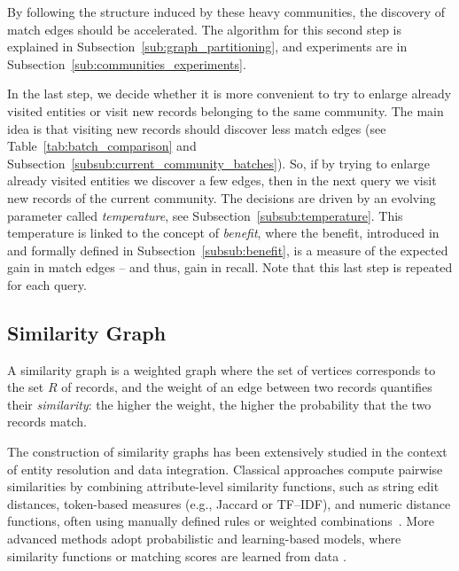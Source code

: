 \documentclass[sigconf, nonacm]{acmart}
\newcommand{\blue}[1]{\textcolor{blue}{#1}}
\begin{document}
By following the structure induced by these heavy communities, the discovery of match edges should be accelerated. The algorithm for this second step is explained in Subsection~\ref{sub:graph_partitioning}, and experiments are in Subsection~\ref{sub:communities_experiments}.

In the last step, we decide whether it is more convenient to try to enlarge already visited entities or visit new records belonging to the same community. The main idea is that visiting new records should discover less match edges (see Table~\ref{tab:batch_comparison} and Subsection~\ref{subsub:current_community_batches}). So, if by trying to enlarge already visited entities we discover a few edges, then in the next query we visit new records of the current community. The decisions are driven by an evolving parameter called \emph{temperature}, see Subsection~\ref{subsub:temperature}. This temperature is linked to the concept of  \emph{benefit}, where the benefit, introduced in~\cite{firmani2016online} and formally defined in Subsection~\ref{subsub:benefit}, is a measure of the expected gain in match edges -- and thus, gain in recall.  Note that this last step is repeated for each query.




\subsection{Similarity Graph}\label{sub:similarity_graph}

A similarity graph is a weighted graph where the set of vertices corresponds to the set $R$ of records, and the weight of an edge between two records quantifies their \emph{similarity}: the higher the weight, the higher the probability that the two records match.


The construction of similarity graphs has been extensively studied in the context of entity resolution and data integration.
Classical approaches compute pairwise similarities by combining attribute-level similarity functions, such as string edit distances, token-based measures (e.g., Jaccard or TF–IDF), and numeric distance functions, often using manually defined rules or weighted combinations~\cite{DBLP:books/daglib/0030287, DBLP:journals/pvldb/PaulsenGD23}.
More advanced methods adopt probabilistic and learning-based models, where similarity functions or matching scores are learned from data \cite{li2020deep, peeters2023using, wang2023sudowoodo}.
\end{document}
